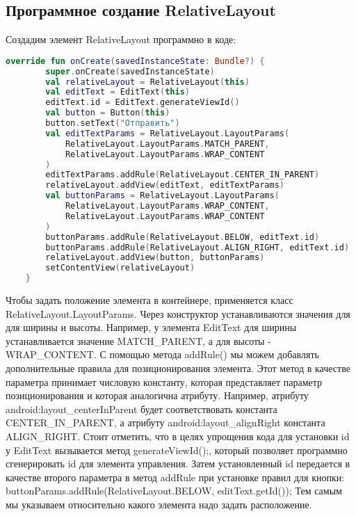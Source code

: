 \subsection{Программное создание RelativeLayout}
Создадим элемент RelativeLayout программно в коде:
\begin{lstlisting}[language=Kotlin, caption=\leftline{Kotlin}, label=lst:RelativeLayout2]
override fun onCreate(savedInstanceState: Bundle?) {
        super.onCreate(savedInstanceState)
        val relativeLayout = RelativeLayout(this)
        val editText = EditText(this)
        editText.id = EditText.generateViewId()
        val button = Button(this)
        button.setText("Отправить")
        val editTextParams = RelativeLayout.LayoutParams(
            RelativeLayout.LayoutParams.MATCH_PARENT,
            RelativeLayout.LayoutParams.WRAP_CONTENT
        )
        editTextParams.addRule(RelativeLayout.CENTER_IN_PARENT)
        relativeLayout.addView(editText, editTextParams)
        val buttonParams = RelativeLayout.LayoutParams(
            RelativeLayout.LayoutParams.WRAP_CONTENT,
            RelativeLayout.LayoutParams.WRAP_CONTENT
        )
        buttonParams.addRule(RelativeLayout.BELOW, editText.id)
        buttonParams.addRule(RelativeLayout.ALIGN_RIGHT, editText.id)
        relativeLayout.addView(button, buttonParams)
        setContentView(relativeLayout)
    }
\end{lstlisting}
Чтобы задать положение элемента в контейнере, применяется класс
RelativeLayout.LayoutParams.
Через конструктор устанавливаются значения
для для ширины и высоты.
Например, у элемента EditText для ширины
устанавливается значение MATCH\_PARENT, а для высоты -
WRAP\_CONTENT.
С помощью метода addRule() мы можем добавлять дополнительные правила
для позиционирования элемента.
Этот метод в качестве параметра принимает
числовую константу, которая представляет параметр позиционирования и
которая аналогична атрибуту.
Например, атрибуту
android:layout\_centerInParent будет соответствовать константа
CENTER\_IN\_PARENT, а атрибуту android:layout\_alignRight константа
ALIGN\_RIGHT.
Стоит отметить, что в целях упрощения кода для установки id у EditText
вызывается метод generateViewId();, который позволяет программно
сгенерировать id для элемента управления.
Затем установленный id передается в качестве второго параметра в метод
addRule при установке правил для кнопки:
buttonParams.addRule(RelativeLayout.BELOW, editText.getId());
Тем самым мы указываем относительно какого элемента надо задать
расположение.
